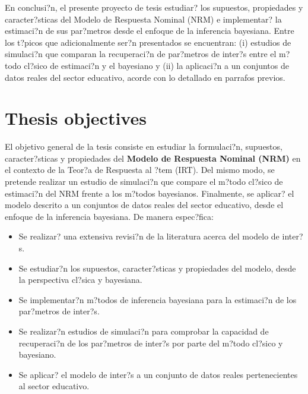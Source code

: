 En conclusi?n, el presente proyecto de tesis estudiar? los supuestos, propiedades y caracter?sticas del Modelo de Respuesta Nominal (NRM) e implementar? la estimaci?n de sus par?metros desde el enfoque de la  inferencia bayesiana. Entre los t?picos que adicionalmente ser?n presentados se encuentran: (i) estudios de simulaci?n que comparan la recuperaci?n de par?metros de inter?s entre el m?todo cl?sico de estimaci?n y el bayesiano y (ii) la aplicaci?n a un conjuntos de datos reales del sector educativo, acorde con lo detallado en parrafos previos.



\section{Thesis objectives}

El objetivo general de la tesis consiste en estudiar la formulaci?n, supuestos, caracter?sticas y propiedades del \textbf{Modelo de Respuesta Nominal (NRM)}   en el contexto de la Teor?a de Respuesta al ?tem (IRT). Del mismo modo, se pretende realizar un estudio de simulaci?n que compare el m?todo cl?sico de estimaci?n del NRM frente a los m?todos bayesianos. Finalmente, se aplicar? el modelo descrito a un conjuntos de datos reales del sector educativo, desde el enfoque de la inferencia bayesiana. De manera espec?fica:

\begin{itemize}
\item Se realizar? una extensiva revisi?n de la literatura acerca del modelo de inter?s.
\item Se estudiar?n los supuestos, caracter?sticas y propiedades del modelo, desde la perspectiva cl?sica y bayesiana.
\item Se implementar?n m?todos de inferencia bayesiana para la estimaci?n de los par?metros de inter?s.
\item Se realizar?n estudios de simulaci?n para comprobar la capacidad de recuperaci?n de los par?metros de inter?s por parte del m?todo cl?sico y bayesiano.
\item Se aplicar? el modelo de inter?s a un conjunto de datos reales pertenecientes al sector educativo.
\end{itemize}
